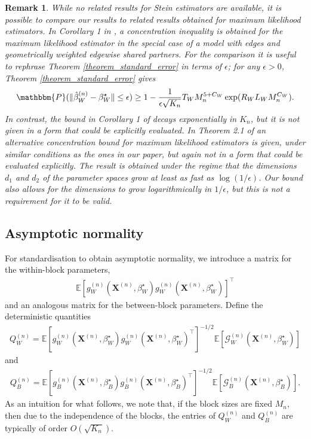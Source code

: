 \documentclass{article}
\newtheorem{Remark}[Theorem]{Remark}
\begin{document}
\begin{Remark}
While no related results for Stein estimators are available, it is possible to compare our results to related results obtained for maximum likelihood estimators. 
In Corollary 1 in \cite{schweinberger2020concentration}, a concentration inequality is obtained for the maximum likelihood estimator in the special case of a model with edges and geometrically weighted edgewise shared partners. For the comparison it is useful to rephrase Theorem \ref{theorem_standard_error} in terms of $\epsilon$; 
 for any $\epsilon >0$, Theorem \ref{theorem_standard_error} gives 
\begin{align}\label{eq:epsilonbound}
    \mathbbm{P}(  \Vert \hat{\beta}_W^{(n)} - \beta_W^{\star} \Vert \leq \epsilon) \geq 
    1 -  \frac{1}{\epsilon \sqrt{K_n}}{T_W M_n^{5+C_W} \exp(R_W L_W M_n^{C_W} )}.
\end{align}
 In contrast, the bound in Corollary 1 of \cite{schweinberger2020concentration} decays exponentially in $K_n$, but it is not given in a form that  could be explicitly evaluated. 
  In Theorem 2.1 of \cite{stewart2026rates} an alternative concentration bound for maximum likelihood estimators is given,  under similar conditions as the ones in our paper, but again  not in a form that could  be evaluated explicitly. The result is obtained under the regime that the dimensions $d_1$ and $d_2$ of the parameter spaces grow at least as fast as $\log (1 / \epsilon)$.  Our bound also allows for the dimensions to grow logarithmically in $1/ \epsilon$, but this is not a requirement for it  to be valid.
\end{Remark}

\subsection{Asymptotic normality} \label{section_asymptotic_normality}
For standardisation to obtain asymptotic normality, we introduce a matrix for the within-block parameters,  
\begin{align*}
    \mathbb{E}[g_W^{(n)}(\mathbf{X}^{(n)},\beta_W^{\star})g_W^{(n)}(\mathbf{X}^{(n)},\beta_W^{\star})]^{\top}
\end{align*}
and an analogous  matrix for the between-block parameters. 
Define the deterministic quantities 
\begin{align*} 
    Q_W^{(n)} =  \mathbb{E}[g_W^{(n)}(\mathbf{X}^{(n)},\beta_W^{\star})g_W^{(n)}(\mathbf{X}^{(n)},\beta_W^{\star})^{\top}]^{-1/2} \mathbb{E}[\mathcal{G}_W^{(n)}(\mathbf{X}^{(n)},\beta_W^{\star})]
\end{align*}
and 
\begin{align*}
    Q_B^{(n)} =  \mathbb{E}[g_B^{(n)}(\mathbf{X}^{(n)},\beta_B^{\star})g_B^{(n)}(\mathbf{X}^{(n)},\beta_B^{\star})^{\top}]^{-1/2} \mathbb{E}[\mathcal{G}_B^{(n)}(\mathbf{X}^{(n)},\beta_B^{\star})].
\end{align*}
As an intuition for what follows, we note that, if the  block sizes are fixed $M_n$, then due to the independence of the blocks,  the entries of $Q_W^{(n)}$ and $Q_B^{(n)}$ are typically of order $ O( \sqrt{K_n})$.
\end{document}
